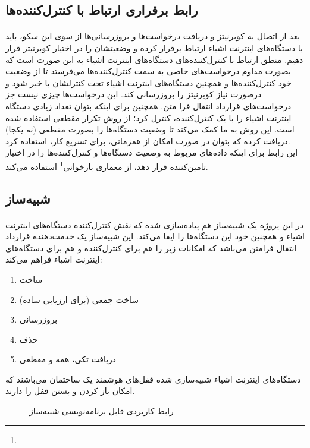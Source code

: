 \subsection{رابط برقراری ارتباط با کنترل‌کننده‌ها}
\label{subsec:connector}
\paragraph{}
{
    بعد از اتصال به کوبرنیتز و دریافت درخواست‌ها و بروزرسانی‌ها از سوی این سکو، باید با دستگاه‌های اینترنت اشیاء ارتباط برقرار کرده و وضعیتشان را در اختیار کوبرنیتز قرار دهیم.
    منطق ارتباط با کنترل‌کننده‌های دستگاه‌های اینترنت اشیاء به این صورت است که بصورت مداوم درخواست‌های خاصی به سمت کنترل‌کننده‌ها می‌فرستد تا از وضعیت خود کنترل‌کننده‌ها و همچنین دستگاه‌های اینترنت اشیاء تحت کنترلشان با خبر شود و درصورت نیاز کوبرنیتز را بروزرسانی کند. 
    این درخواست‌ها چیزی نیست جز درخواست‌های قرارداد انتقال فرا متن. همچنین برای اینکه بتوان تعداد زیادی دستگاه‌ اینترنت اشیاء را با یک کنترل‌کننده، کنترل کرد؛ از روش تکرار مقطعی استفاده شده است. این روش به ما کمک می‌کند تا وضعیت دستگاه‌ها را بصورت مقطعی (نه یکجا) دریافت کرده که بتوان در صورت امکان از همزمانی، برای تسریع کار، استفاده کرد.
    \\
    این رابط برای اینکه داده‌های مربوط به وضعیت دستگاه‌ها و کنترل‌کننده‌ها را در اختیار تامین‌کننده قرار دهد، از معماری بازخوانی\footnote{} استفاده می‌کند.
}

\subsection{شبیه‌ساز‍}
\label{subsec:simulator}
\paragraph{}
{
    در این پروژه یک شبیه‌ساز هم پیاده‌سازی شده که نقش کنترل‌کننده دستگاه‌های اینترنت اشیاء و همچنین خود این دستگاه‌ها را ایفا می‌کند. این شبیه‌ساز یک خدمت‌دهنده قرارداد انتقال فرامتن می‌باشد که امکانات زیر را هم برای کنترل‌کننده و هم برای دستگاه‌های اینترنت اشیاء فراهم می‌کند:
    \begin{enumerate}
        \item ساخت
        \item ساخت جمعی (برای ارزیابی ساده)
        \item بروزرسانی
        \item حذف
        \item دریافت تکی، همه و مقطعی
    \end{enumerate}
    دستگاه‌های اینترنت اشیاء شبیه‌سازی شده قفل‌های هوشمند یک ساختمان می‌باشند که امکان باز کردن و بستن قفل را دارند.
    \begin{figure}[H]
        \caption{رابط کاربردی قابل برنامه‌نویسی شبیه‌ساز}
        \label{fig:sim_api}
    \end{figure}
}

